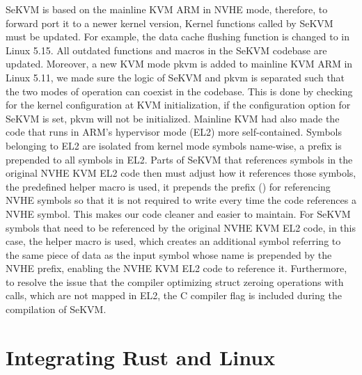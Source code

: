 SeKVM is based on the mainline KVM ARM in NVHE mode, therefore, to forward port
it to a newer kernel version, Kernel functions called by SeKVM must be updated. For example,
the data cache flushing function  is changed to
 in Linux 5.15.
All outdated functions and macros in the SeKVM codebase are updated.
Moreover, a new KVM mode pkvm \cite{pkvm} is added to mainline KVM ARM in Linux
5.11, we made sure the logic of SeKVM and pkvm is separated such that the two
modes of operation can coexist in the codebase. This is done by checking for
the kernel configuration at KVM initialization, if the configuration option for
SeKVM is set, pkvm will not be initialized.
Mainline KVM had also made the code that runs in ARM's hypervisor mode (EL2)
more self-contained. Symbols belonging to EL2 are isolated from kernel mode
symbols name-wise, a prefix  is prepended to all symbols
in EL2.
Parts of SeKVM that references symbols in the original NVHE KVM EL2 code then
must adjust how it references those symbols, the predefined helper macro
 is used, it prepends the prefix ()
for referencing NVHE symbols so that it is not required to write
 every time the code references a NVHE symbol. This makes
our code cleaner and easier to maintain. For SeKVM symbols that
need to be referenced by the original NVHE KVM EL2 code, in this case, the helper
macro  is used, which creates an additional symbol referring to the
same piece of data as the input symbol whose name is prepended by the NVHE
prefix, enabling the NVHE KVM EL2 code to reference it.
Furthermore, to resolve the issue that the compiler optimizing struct zeroing
operations with  calls, which are not mapped in EL2, the C
compiler flag  is included during the compilation of
SeKVM.

\section{Integrating Rust and Linux}

%


